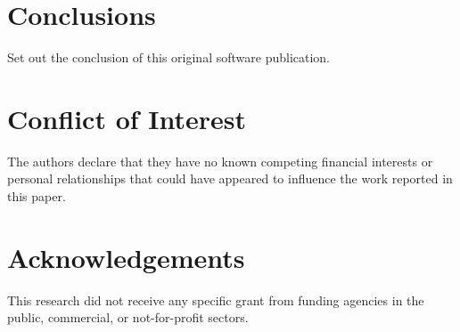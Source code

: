 \documentclass[preprint,12pt,letterpaper]{elsarticle}
\begin{document}

\section{Conclusions}
\label{s:conclusions}

Set out the conclusion of this original software publication.


\section{Conflict of Interest}


The authors declare that they have no known competing financial interests or personal relationships that could have appeared to influence the work reported in this paper.


\section*{Acknowledgements}

This research did not receive any specific grant from funding agencies in the public, commercial, or not-for-profit sectors.






\end{document}
